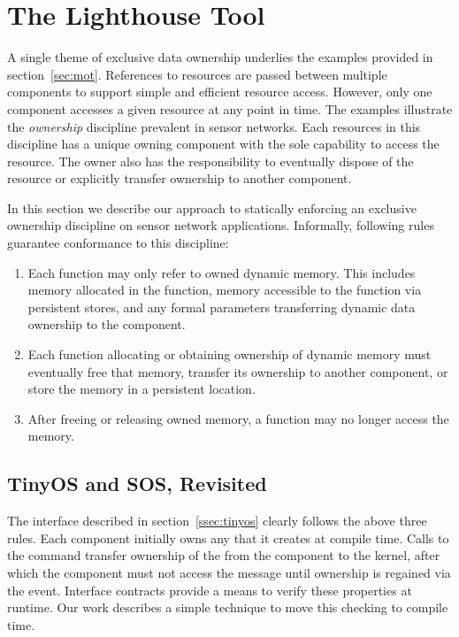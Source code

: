 \section{The Lighthouse Tool}
\label{sec:alg}



A single theme of exclusive data ownership underlies the examples provided in
section~\ref{sec:mot}.
%
References to resources are passed between multiple components to support
simple and efficient resource access.
%
However, only one component accesses a given resource at any point in time.
%
The examples illustrate the {\em ownership} discipline prevalent in sensor
networks.
%
Each resources in this discipline has a unique owning component with the sole
capability to access the resource.
%
The owner also has the responsibility to eventually dispose of the resource or
explicitly transfer ownership to another component.



In this section we describe our approach to statically enforcing an exclusive
ownership discipline on sensor network applications.  
%
Informally, following rules guarantee conformance to this discipline:
%
\begin{enumerate}
%
\item Each function may only refer to owned dynamic memory.  This includes
memory allocated in the function, memory accessible to the function via
persistent stores, and any formal parameters transferring dynamic data
ownership to the component.
%
\item Each function allocating or obtaining ownership of dynamic memory must
eventually free that memory, transfer its ownership to another component, or
store the memory in a persistent location.
%
\item After freeing or releasing owned memory, a function may no longer access
the memory.
%
\end{enumerate}



\subsection{TinyOS and SOS, Revisited}



The  interface described in section~\ref{ssec:tinyos} clearly
follows the above three rules.
%
Each component initially owns any  that it creates at compile
time.
%
Calls to the  command transfer ownership of the 
from the component to the kernel, after which the component must not access
the message until ownership is regained via the  event.
%
Interface contracts provide a means to verify these properties at runtime.
%
Our work describes a simple technique to move this checking to compile time.
 


